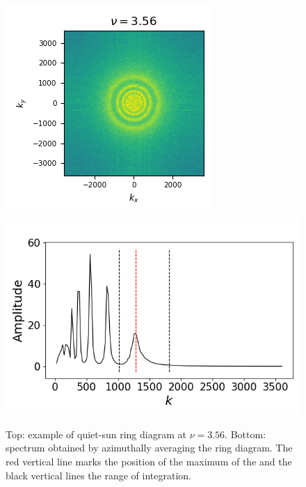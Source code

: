 \documentclass{aa}
\begin{document}
\begin{figure}\centering
	\includegraphics[width=1.0\linewidth,trim={0cm 0.4cm 0cm 0.3cm},clip=TRUE]{ring_diagram}\\
	\includegraphics[width=1.0\linewidth,trim={0cm 0cm 0cm 1cm},clip=TRUE]{az_avg_spec}
	\caption{Top: example of quiet-sun ring diagram at $\nu=3.56$. Bottom: spectrum obtained by azimuthally averaging the ring diagram. The red vertical line marks the position of the maximum of the \fff and the black vertical lines the range of integration.}
	\label{ring_diagram}
\end{figure}
\end{document}
